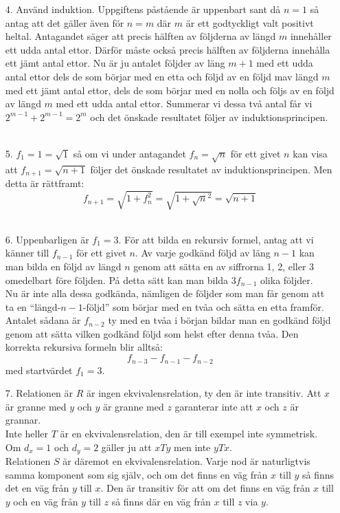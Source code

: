 \documentclass{article}
\begin{document}
\begin{enumerate}
\item[4.]
    Använd induktion. Uppgiftens påstående är uppenbart sant då $n=1$ så antag
    att det gäller även för $n=m$ där $m$ är ett godtyckligt valt positivt
    heltal. Antagandet säger att precis hälften av följderna av längd $m$
    innehåller ett udda antal ettor. Därför måste också precis hälften av
    följderna innehålla ett jämt antal ettor. Nu är ju antalet följder av läng
    $m+1$ med ett udda antal ettor dels de som börjar med en etta och följd av
    en följd mav längd $m$ med ett jämt antal ettor, dels de som börjar med en
    nolla och följs av en följd av längd $m$ med ett udda antal ettor. Summerar
    vi dessa två antal får vi $2^{m-1}+2^{m-1} = 2^m$ och det önskade
    resultatet följer av induktionsprincipen.\\\\

\item[5.]
    $f_1=1=\sqrt{1}$ så om vi under antagandet $f_n = \sqrt{n}$ för ett givet
    $n$ kan visa att $f_{n+1}=\sqrt{n+1}$ följer det önskade resultatet av
    induktionsprincipen. Men detta är rättframt: $$f_{n+1} = \sqrt{1+f_{n}^2} =
    \sqrt{1+\sqrt{n}^2} = \sqrt{n+1}$$\\

\item[6.]
    Uppenbarligen är $f_1=3$. För att bilda en rekursiv formel, antag att vi
    känner till $f_{n-1}$ för ett givet $n$. Av varje godkänd följd av läng
    $n-1$ kan man bilda en följd av längd $n$ genom att sätta en av siffrorna
    1, 2, eller 3 omedelbart före följden. På detta sätt kan man bilda
    $3f_{n-1}$ olika följder.\\
    Nu är inte alla dessa godkända, nämligen de följder som man får genom att
    ta en ``längd-$n-1$-följd'' som börjar med en tvåa och sätta en etta
    framför. Antalet sådana är $f_{n-2}$ ty med en tvåa i början bildar man en
    godkänd följd genom att sätta vilken godkänd följd som helst efter denna
    tvåa. Den korrekta rekursiva formeln blir alltså:
    $$f_{n-3}-f_{n-1}-f_{n-2}$$ med startvärdet $f_1=3$.\\

\item[7.]
    Relationen är $R$ är ingen ekvivalensrelation, ty den är inte transitiv.
    Att $x$ är granne med $y$ och $y$ är granne med $z$ garanterar inte att $x$
    och $z$ är grannar.\\
    Inte heller $T$ är en ekvivalensrelation, den är till exempel inte
    symmetrisk. Om $d_x=1$ och $d_y=2$ gäller ju att $xTy$ men inte
    $yTx$.\\
    Relationen $S$ är däremot en ekvivalensrelation. Varje nod är naturligtvis
    samma komponent som sig själv, och om det finns en väg från $x$ till $y$ så
    finns det en väg från $y$ till $x$. Den är transitiv för att om det finns
    en väg från $x$ till $y$ och en väg från $y$ till $z$ så finns där en väg
    från $x$ till $z$ via $y$.\\

\end{enumerate}
\end{document}
